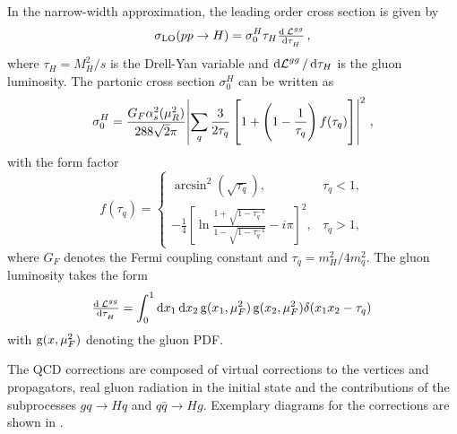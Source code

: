 In the narrow-width approximation, the leading order cross section is given by \cite{gluonfusioncrosssection}
%
\begin{equation}
	\sigma_\text{LO}(pp \rightarrow H) = \sigma_0^H \tau_H \od{\lumi^{gg}}{\tau_H} \, ,
\end{equation}
%
where $\tau_H = M_H^2/s$ is the Drell-Yan variable and $\dif \lumi^{gg} / \dif \tau_H$ is the gluon luminosity.
The partonic cross section $\sigma_0^H$ can be written as
\begin{equation}
	\sigma_0^H = \frac{G_F \alpha_s^2(\mu_R^2)}{288 \sqrt{2} \pi} \abs{ \sum_q \frac{3}{2 \tau_q} \left[ 1 + \left( 1 - \frac{1}{\tau_q} \right) f(\tau_q) \right] }^2  \, ,
\end{equation}
%
with the form factor
%
\begin{equation}
	f(\tau_q) = 
	\begin{cases}
		\arcsin^2 \left( \sqrt{\tau_q} \right) ,																& \tau_q < 1, \\
		- \frac{1}{4} \left[ \ln \frac{1 + \sqrt{1-\tau_q^{-1}}}{1 - \sqrt{1-\tau_q^{-1}}} -i \pi \right]^2 ,	& \tau_q > 1,
	\end{cases}
\end{equation}
%
where $G_F$ denotes the Fermi coupling constant and $\tau_q = m_H^2/4m_q^2$.
The gluon luminosity takes the form
%
\begin{equation}
	\od{\lumi^{gg}}{\tau_H} = \int_0^1 \dif x_1 \dif x_2 \gluonpdf(x_1,\mu_F^2) \gluonpdf(x_2,\mu_F^2) \delta(x_1 x_2 - \tau_q) \,
\end{equation}
%
with $\operatorname{g}(x,\mu_F^2)$ denoting the gluon PDF.

The QCD corrections are composed of virtual corrections to the vertices and propagators, real gluon radiation in the initial state and the contributions of the subprocesses $gq \rightarrow Hq$ and $q \bar q \rightarrow Hg$.
Exemplary diagrams for the corrections are shown in .

